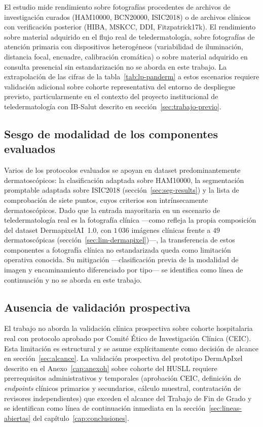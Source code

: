 El estudio mide rendimiento sobre fotografías procedentes de
archivos de investigación curados (HAM10000, BCN20000, ISIC2018) o
de archivos clínicos con verificación posterior (HIBA, MSKCC, DDI,
Fitzpatrick17k). El rendimiento sobre material adquirido en el
flujo real de teledermatología, sobre fotografías de atención
primaria con dispositivos heterogéneos (variabilidad de
iluminación, distancia focal, encuadre, calibración cromática) o
sobre material adquirido en consulta presencial sin estandarización
no se aborda en este trabajo. La extrapolación de las cifras de la
tabla~\ref{tab:lp-panderm} a estos escenarios requiere validación
adicional sobre cohorte representativa del entorno de despliegue
previsto, particularmente en el contexto del proyecto institucional
de teledermatología con IB-Salut descrito en
sección~\ref{sec:trabajo-previo}.

\subsection{Sesgo de modalidad de los componentes evaluados}
\label{sec:lim-modalidad-sistema}

Varios de los protocolos evaluados se apoyan en dataset
predominantemente dermatoscópicos: la clasificación adaptada sobre
HAM10000, la segmentación promptable adaptada sobre ISIC2018
(sección~\ref{sec:seg-results}) y la lista de comprobación de
siete puntos, cuyos criterios son intrínsecamente dermatoscópicos.
Dado que la entrada mayoritaria en un escenario de teledermatología
real es la fotografía clínica ---como refleja la propia composición
del dataset DermapixelAI~1.0, con $1\,036$ imágenes clínicas frente a
$49$ dermatoscópicas (sección~\ref{sec:lim-dermapixel})---, la
transferencia de estos componentes a fotografía clínica no
estandarizada queda como limitación operativa conocida. Su
mitigación ---clasificación previa de la modalidad de imagen y
encaminamiento diferenciado por tipo--- se identifica como línea de
continuación y no se aborda en este trabajo.

\subsection{Ausencia de validación prospectiva}
\label{sec:lim-prospectivo}

El trabajo no aborda la validación clínica prospectiva sobre
cohorte hospitalaria real con protocolo aprobado por Comité Ético
de Investigación Clínica (CEIC). Esta limitación es estructural y
se asume explícitamente como decisión de alcance en
sección~\ref{sec:alcance}. La validación prospectiva del prototipo
DermApIxel descrito en el Anexo~\ref{cap:anexoh} sobre cohorte del
HUSLL requiere prerrequisitos administrativos y temporales
(aprobación CEIC, definición de \emph{endpoints} clínicos
primarios y secundarios, cálculo muestral, contratación de
revisores independientes) que exceden el alcance del Trabajo de
Fin de Grado y se identifican como línea de continuación inmediata
en la sección~\ref{sec:lineas-abiertas} del capítulo~\ref{cap:conclusiones}.

